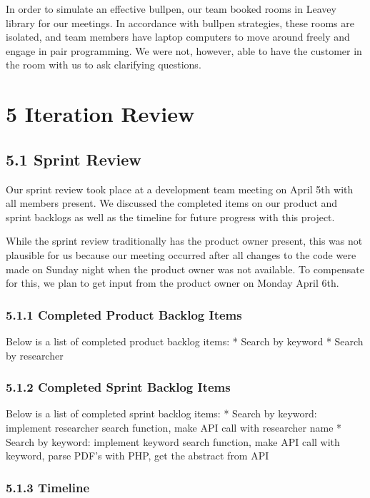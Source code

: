 \documentclass[]{article}
\begin{document}
In order to simulate an effective bullpen, our team booked rooms in
Leavey library for our meetings. In accordance with bullpen strategies,
these rooms are isolated, and team members have laptop computers to move
around freely and engage in pair programming. We were not, however, able
to have the customer in the room with us to ask clarifying questions.

\section{5 Iteration Review}\label{iteration-review}

\subsection{5.1 Sprint Review}\label{sprint-review}

Our sprint review took place at a development team meeting on April 5th
with all members present. We discussed the completed items on our
product and sprint backlogs as well as the timeline for future progress
with this project.

While the sprint review traditionally has the product owner present,
this was not plausible for us because our meeting occurred after all
changes to the code were made on Sunday night when the product owner was
not available. To compensate for this, we plan to get input from the
product owner on Monday April 6th.

\subsubsection{5.1.1 Completed Product Backlog
Items}\label{completed-product-backlog-items}

Below is a list of completed product backlog items: * Search by keyword
* Search by researcher

\subsubsection{5.1.2 Completed Sprint Backlog
Items}\label{completed-sprint-backlog-items}

Below is a list of completed sprint backlog items: * Search by keyword:
implement researcher search function, make API call with researcher name
* Search by keyword: implement keyword search function, make API call
with keyword, parse PDF's with PHP, get the abstract from API

\subsubsection{5.1.3 Timeline}\label{timeline}
\end{document}
